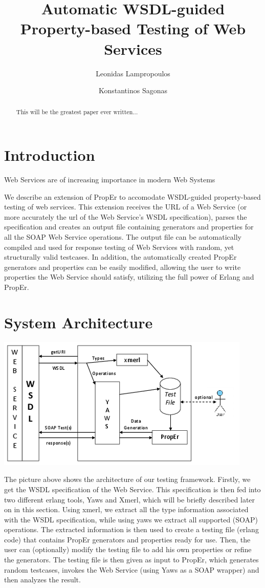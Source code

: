 \documentclass[submission,copyright,a4]{eptcs}
\title{Automatic WSDL-guided Property-based Testing of Web Services}
\author{Leonidas Lampropoulos \and Konstantinos Sagonas}
\begin{document}
\maketitle

\begin{abstract}
 This will be the greatest paper ever written...
\end{abstract}

\section{Introduction}

Web Services are of increasing importance in modern Web Systems

We describe an extension of PropEr to accomodate WSDL-guided property-based testing of web services. This extension receives the URL of a Web Service (or more accurately the url of the Web Service's WSDL specification), parses the specification and creates an output file containing generators and properties for all the SOAP Web Service operations. The output file can be automatically compiled and used for response testing of Web Services with random, yet structurally valid testcases. In addition, the automatically created PropEr generators and properties can be easily modified, allowing the user to write properties the Web Service should satisfy, utilizing the full power of Erlang and PropEr.

\section{System Architecture}


\includegraphics{PropErWebFramework.png}

The picture above shows the architecture of our testing framework. Firstly, we get the WSDL specification of the Web Service. This specification is then fed into two different erlang tools, Yaws and Xmerl, which will be briefly described later on in this section. Using xmerl, we extract all the type information associated with the WSDL specification, while using yaws we extract all supported (SOAP) operations. The extracted information is then used to create a testing file (erlang code) that contains PropEr generators and properties ready for use. Then, the user can (optionally) modify the testing file to add his own properties or refine the generators. The testing file is then given as input to PropEr, which generates random testcases, invokes the Web Service (using Yaws as a SOAP wrapper) and then analyzes the result.
\end{document}
